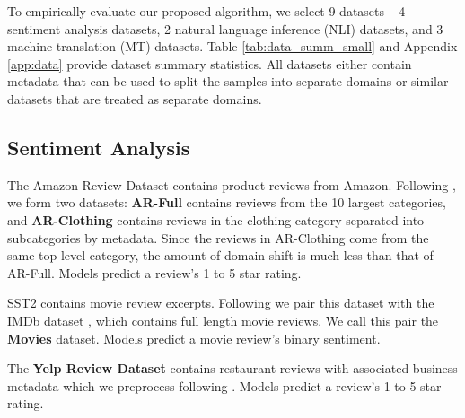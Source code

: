 To empirically evaluate our proposed algorithm, we select 9 datasets -- 4 sentiment analysis datasets, 2 natural language inference (NLI) datasets, and 3 machine translation (MT) datasets.
Table \ref{tab:data_summ_small} and Appendix \ref{app:data} provide dataset summary statistics.
All datasets either contain metadata that can be used to split the samples into separate domains or similar datasets that are treated as separate domains. 

\subsection{Sentiment Analysis}        
The Amazon Review Dataset \citep{jianmo} contains product reviews from Amazon. 
Following \citealt{hendrycks2020pretrained}, we form two datasets: 
\textbf{AR-Full} contains reviews from the 10 largest categories, and 
\textbf{AR-Clothing} contains reviews in the clothing category separated into subcategories by metadata. %
Since the reviews in AR-Clothing come from the same top-level category, the amount of domain shift is much less than that of AR-Full.
Models predict a review's 1 to 5 star rating.
    
SST2 \citep{socher2013recursive} contains movie review excerpts. 
Following \citealt{hendrycks2020pretrained} we pair this dataset with the IMDb dataset \citep{maas2011learning}, which contains full length movie reviews.
We call this pair the \textbf{Movies} dataset.
Models predict a movie review's binary sentiment. 
    
The \textbf{Yelp Review Dataset} contains restaurant reviews with associated business metadata which we preprocess following \citealt{hendrycks2020pretrained}.
Models predict a review's 1 to 5 star rating.

